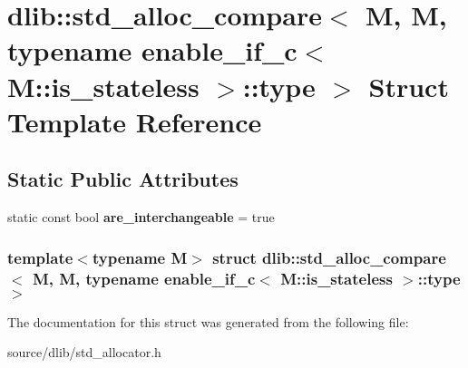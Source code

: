 \hypertarget{structdlib_1_1std__alloc__compare_3_01M_00_01M_00_01typename_01enable__if__c_3_01M_1_1is__stateless_01_4_1_1type_01_4}{
\section{dlib::std\_\-alloc\_\-compare$<$ M, M, typename enable\_\-if\_\-c$<$ M::is\_\-stateless $>$::type $>$ Struct Template Reference}
\label{structdlib_1_1std__alloc__compare_3_01M_00_01M_00_01typename_01enable__if__c_3_01M_1_1is__stateless_01_4_1_1type_01_4}
}
\subsection*{Static Public Attributes}
\begin{DoxyCompactItemize}
\item 
\hypertarget{structdlib_1_1std__alloc__compare_3_01M_00_01M_00_01typename_01enable__if__c_3_01M_1_1is__stateless_01_4_1_1type_01_4_aea50547f254a5fff23948f8fdfdae0b0}{
static const bool {\bfseries are\_\-interchangeable} = true}
\label{structdlib_1_1std__alloc__compare_3_01M_00_01M_00_01typename_01enable__if__c_3_01M_1_1is__stateless_01_4_1_1type_01_4_aea50547f254a5fff23948f8fdfdae0b0}

\end{DoxyCompactItemize}
\subsubsection*{template$<$typename M$>$ struct dlib::std\_\-alloc\_\-compare$<$ M, M, typename enable\_\-if\_\-c$<$ M::is\_\-stateless $>$::type $>$}



The documentation for this struct was generated from the following file:\begin{DoxyCompactItemize}
\item 
source/dlib/std\_\-allocator.h\end{DoxyCompactItemize}
